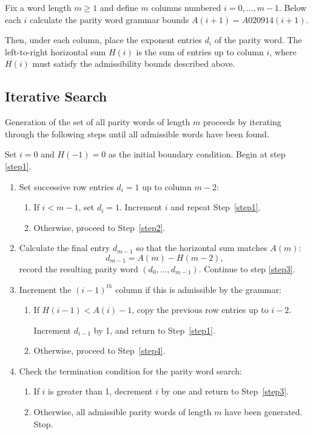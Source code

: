 \documentclass[12pt, oneside]{article}   	%
\numberwithin{equation}{section}          %
\theoremstyle{definition}
\begin{document}
Fix a word length $m \ge 1$ and define $m$ columns numbered $i=0,\dots,m-1$.
Below each $i$ calculate the parity word grammar bounds $A(i+1)=A020914(i+1)$.

Then, under each column, place the exponent entries $d_i$ of the parity word.
The left-to-right horizontal sum $H(i)$ is the sum of entries up to column $i$,
where $H(i)$ must satisfy the admissibility bounds described above.


\subsection*{Iterative Search}
Generation of the set of all parity words of length $m$ proceeds by iterating
through the following steps until all admissible words have been found.

Set $i=0$ and $H(-1)=0$ as the initial boundary condition.  Begin at step \ref{step1}.

\begin{enumerate}

\item Set successive row entries $d_i=1$ up to column $m-2$:
\label{step1}
\begin{enumerate}
  \item If $i<m-1$, set $d_i=1$.
  Increment $i$ and repeat Step~\ref{step1}.
  \item Otherwise, proceed to Step~\ref{step2}.
\end{enumerate}

\item Calculate the final entry $d_{m-1}$ so that the horizontal sum matches $A(m)$:
\label{step2}
\[
d_{m-1} = A(m) - H(m-2),
\]
record the resulting parity word $(d_0,\dots,d_{m-1})$. Continue to step \ref{step3}.

\item Increment the $(i-1)^{th}$ column if this is admissible by the grammar:
\label{step3}
\begin{enumerate}
  \item If $H(i-1) < A(i) - 1$, copy the previous row entries up to $i-2$.

  Increment $d_{i-1}$ by 1, and return to Step~\ref{step1}.
  \item Otherwise, proceed to Step~\ref{step4}.
\end{enumerate}

\item Check the termination condition for the parity word search:
\label{step4}

\begin{enumerate}
  \item If $i$ is greater than 1, decrement $i$ by one and return to Step~\ref{step3}.
  \item Otherwise, all admissible parity words of length $m$ have been generated.  Stop.
\end{enumerate}

\end{enumerate}
\end{document}
